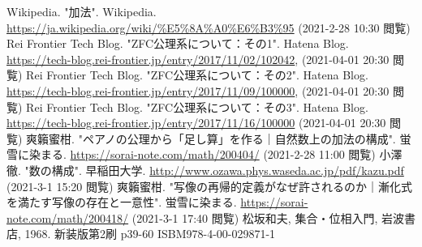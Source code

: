 \documentclass[dvipdfmx]{jsarticle}
\begin{document}
\begin{thebibliography}{50}
  Wikipedia. "加法". Wikipedia. \url{https://ja.wikipedia.org/wiki/%E5%8A%A0%E6%B3%95}
  (2021-2-28 10:30 閲覧)
  Rei Frontier Tech Blog. "ZFC公理系について：その1". Hatena Blog. \url{https://tech-blog.rei-frontier.jp/entry/2017/11/02/102042}, (2021-04-01 20:30 閲覧)
  Rei Frontier Tech Blog. "ZFC公理系について：その2". Hatena Blog. \url{https://tech-blog.rei-frontier.jp/entry/2017/11/09/100000}, (2021-04-01 20:30 閲覧)
  Rei Frontier Tech Blog. "ZFC公理系について：その3". Hatena Blog. \url{https://tech-blog.rei-frontier.jp/entry/2017/11/16/100000} (2021-04-01 20:30 閲覧)
  爽籟蜜柑. "ペアノの公理から「足し算」を作る｜自然数上の加法の構成". 蛍雪に染まる. \url{https://sorai-note.com/math/200404/} (2021-2-28 11:00 閲覧)
  小澤徹. "数の構成". 早稲田大学. \url{http://www.ozawa.phys.waseda.ac.jp/pdf/kazu.pdf}
  (2021-3-1 15:20 閲覧)
  爽籟蜜柑. "写像の再帰的定義がなぜ許されるのか｜漸化式を満たす写像の存在と一意性". 蛍雪に染まる. \url{https://sorai-note.com/math/200418/} (2021-3-1 17:40 閲覧)
  松坂和夫, 集合・位相入門, 岩波書店, 1968. 新装版第2刷 p39-60 ISBM978-4-00-029871-1
\end{thebibliography}
\end{document}
